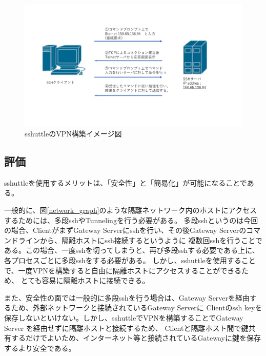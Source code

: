 \documentclass[11pt,a4j,titlepage]{jreport}
\begin{document}
\begin{figure}[tbp]
    \centering
    \includegraphics[width=1.0\textwidth, page=7]{graphs/network_archtecture.pdf}
    \caption{sshuttleのVPN構築イメージ図}
    \label{sshuttleのVPN構築イメージ図}
\end{figure}


\subsection*{評価}
sshuttleを使用するメリットは、「安全性」と「簡易化」が可能になることである。\par
一般的に、図\ref{network_graph}のような隔離ネットワーク内のホストにアクセスするためには、多段sshやTunnelingを行う必要がある。
多段sshというのは今回の場合、ClientがまずGateway Serverにsshを行い、その後Gateway Serverのコマンドラインから、隔離ホストにssh接続するというように
複数回sshを行うことである。この場合、一度sshを切ってしまうと、再び多段sshする必要である上に、各プロセスごとに多段sshをする必要がある。
しかし、sshuttleを使用することで、一度VPNを構築すると自由に隔離ホストにアクセスすることができるため、
とても容易に隔離ホストに接続できる。\par
また、安全性の面では一般的に多段sshを行う場合は、Gateway Serverを経由するため、外部ネットワークと接続されているGateway Serverに
Clientのssh keyを保存しないといけない。しかし、sshuttleでVPNを構築することでGateway Server を経由せずに隔離ホストと接続するため、
Clientと隔離ホスト間で鍵共有するだけでよいため、インターネット等と接続されているGatewayに鍵を保存するより安全である。


\end{document}
